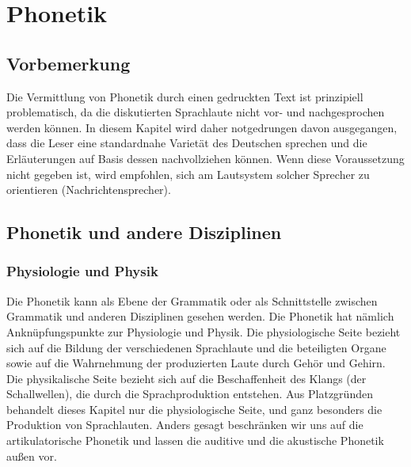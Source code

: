 \chapter{Phonetik}

\label{sec:phonetik}

\section*{Vorbemerkung}

Die Vermittlung von Phonetik durch einen gedruckten Text ist prinzipiell problematisch, da die diskutierten Sprachlaute nicht vor- und nachgesprochen werden können.
In diesem Kapitel wird daher notgedrungen davon ausgegangen, dass die Leser eine standardnahe Varietät des Deutschen sprechen und die Erläuterungen auf Basis dessen nachvollziehen können.
Wenn diese Voraussetzung nicht gegeben ist, wird empfohlen, sich am Lautsystem solcher Sprecher zu orientieren (\zB Nachrichtensprecher).

\section{Phonetik und andere Disziplinen}

\subsection{Physiologie und Physik}

Die Phonetik kann als Ebene der Grammatik oder als Schnittstelle zwischen Grammatik und anderen Disziplinen gesehen werden.
Die Phonetik hat nämlich Anknüpfungspunkte zur Physiologie und Physik.
Die physiologische Seite bezieht sich auf die Bildung der verschiedenen Sprachlaute und die beteiligten Organe sowie auf die Wahrnehmung der produzierten Laute durch Gehör und Gehirn.
Die physikalische Seite bezieht sich auf die Beschaffenheit des Klangs (der Schallwellen), die durch die Sprachproduktion entstehen.
Aus Platzgründen behandelt dieses Kapitel nur die physiologische Seite, und ganz besonders die Produktion von Sprachlauten.
Anders gesagt beschränken wir uns auf die artikulatorische Phonetik und lassen die auditive und die akustische Phonetik außen vor.


